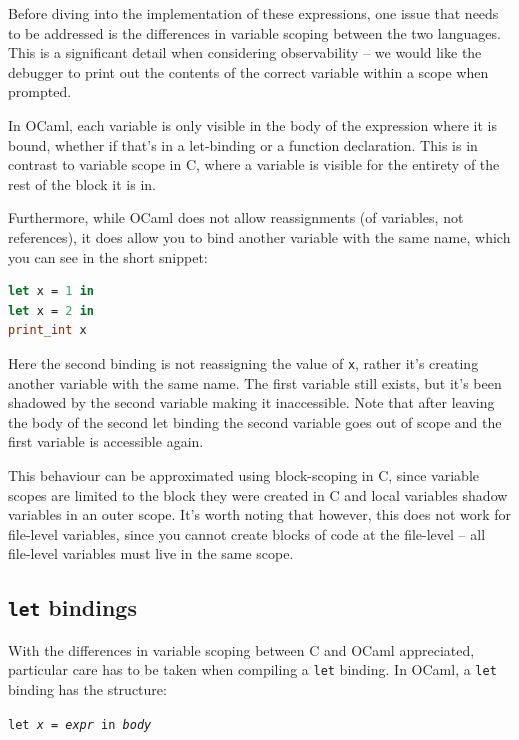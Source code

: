 \documentclass[12pt,a4paper,twoside,openright]{report}
\begin{document}
Before diving into the implementation of these expressions, one issue that 
needs to be addressed is the differences in variable scoping between the two 
languages. This is a significant detail when considering observability -- we 
would like the debugger to print out the contents of the correct variable 
within a scope when prompted.

In OCaml, each variable is only visible in the body of the expression where it 
is bound, whether if that's in a let-binding or a function declaration. This is 
in contrast to variable scope in C, where a variable is visible for the 
entirety of the rest of the block it is in.

Furthermore, while OCaml does not allow reassignments (of variables, not 
references), it does allow you to bind another variable with the same name, 
which you can see in the short snippet:

\begin{lstlisting}[language=Caml]
let x = 1 in
let x = 2 in
print_int x
\end{lstlisting} 

Here the second binding is not reassigning the value of \texttt{x}, rather it's 
creating another variable with the same name. The first variable still exists, 
but it's been shadowed by the second variable making it inaccessible. Note that 
after leaving the body of the second let binding the second variable goes out 
of scope and the first variable is accessible again.

This behaviour can be approximated using block-scoping in C, since variable 
scopes are limited to the block they were created in C and local variables 
shadow variables in an outer scope. It's worth noting that however, this does 
not work for file-level variables, since you cannot create blocks of code at 
the file-level -- all file-level variables must live in the same scope.

\subsection{\texttt{let} bindings}

With the differences in variable scoping between C and OCaml appreciated, 
particular care has to be taken when compiling a \texttt{let} binding. In 
OCaml, a \texttt{let} binding has the structure:

\begin{center}
    \texttt{let \emph{x} = \emph{expr} in \emph{body}}
\end{center}
\end{document}
